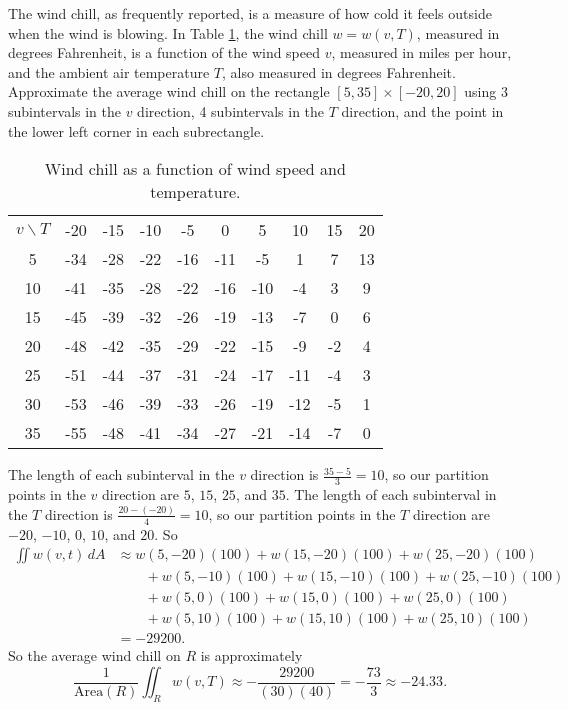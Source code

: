 \begin{exercises}
\item The wind chill, as frequently   reported, is a measure of how cold it feels outside when the wind is blowing.  In Table \ref{T:11.1.Ex.wind.chill}, the wind chill $w=w(v,T)$, measured in degrees Fahrenheit, is a function of the wind speed $v$, measured in miles per hour, and the ambient air temperature $T$, also measured in degrees Fahrenheit. Approximate the average wind chill on the rectangle $[5,35] \times [-20,20]$ using 3 subintervals in the $v$ direction, 4 subintervals in the $T$ direction, and the point in the lower left corner in each subrectangle. 
\begin{table}[ht] 
  \begin{center}
    \begin{tabular}{|c||c|c|c|c|c|c|c|c|c|}
      \hline
      $v \backslash T$  
         &-20 &-15 &-10 &-5  &0   &5   &10  &15  &20  \\
      \hhline{|=||=|=|=|=|=|=|=|=|=|}
      5  &-34 &-28 &-22 &-16 &-11 &-5 &1 &7 &13  \\
      \hline
      10 &-41 &-35 &-28 &-22 &-16 &-10 &-4 &3 &9   \\
      \hline
      15  &-45 &-39 &-32 &-26 &-19 &-13 &-7 &0 &6  \\
      \hline
      20 &-48 &-42 &-35 &-29 &-22 &-15 &-9 &-2 &4  \\
      \hline
      25 &-51 &-44 &-37 &-31 &-24 &-17 &-11 &-4 &3 \\
      \hline
      30  &-53 &-46 &-39 &-33 &-26 &-19 &-12 &-5 &1 \\
      \hline
      35  &-55 &-48 &-41 &-34 &-27 &-21 &-14 &-7 &0 \\
      \hline
    \end{tabular}
    \caption{Wind chill as a function of wind speed and temperature.}
    \label{T:11.1.Ex.wind.chill}
  \end{center}
\end{table}

\begin{exerciseSolution}
The length of each subinterval in the $v$ direction is $\frac{35-5}{3} = 10$, so our partition points in the $v$ direction are $5$, $15$, $25$, and $35$. The length of each subinterval in the $T$ direction is $\frac{20-(-20)}{4} = 10$, so our partition points in the $T$ direction are $-20$, $-10$, $0$, $10$, and $20$. So
\begin{align*}
\iint w(v,t) \, dA &\approx w(5,-20)(100) + w(15,-20)(100) + w(25,-20)(100) \\
	&\qquad + w(5,-10)(100) + w(15,-10)(100) + w(25,-10)(100) \\
	&\qquad + w(5,0)(100) + w(15,0)(100) + w(25,0)(100)  \\
	&\qquad + w(5,10)(100) + w(15,10)(100) + w(25,10)(100) \\
	&= -29200.
\end{align*}
So the average wind chill on $R$ is approximately
\[ \frac{1}{\text{Area}(R)} \iint_R w(v,T) \approx -\frac{29200}{(30)(40)} = -\frac{73}{3} \approx -24.33.\]
	

\end{exerciseSolution}
\end{exercises}

